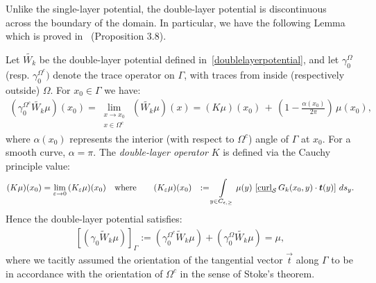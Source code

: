 Unlike the single-layer potential, the double-layer potential is
discontinuous across the boundary of the domain.  In particular, we have
the following Lemma which is proved in~\cite{mit:tay1999} (Proposition
3.8).
\begin{lemma} 
\label{l:DLPjump} 
Let $\widetilde{W_k}$ be the double-layer potential defined
in~\eqref{doublelayerpotential}, and let $\gamma_0^{\Omega}$ (resp.
$\gamma_0^{\Omega^c})$ denote the trace operator on $\Gamma$, with
traces from inside (respectively outside) $\Omega$.  For $x_{0} \in
\Gamma$ we have:
\begin{align*} 
  (\gamma^{\Omega^{c}}_0\widetilde{W_k}\mu)(x_0)=
  \lim\limits_{\substack{x \to x_0 \\ x \in \Omega^{c}}}\, 
  (\widetilde{W_k}\mu)(x) =
  (K\mu)(x_0)\,+\,\left(1-\frac{\alpha(x_0)}{2\pi}\right)\,\mu(x_0),
\end{align*}
where $\alpha(x_{0})$ represents the interior (with respect to
$\Omega^{c}$) angle of $\Gamma$ at $x_{0}$. For a smooth curve, $\alpha
= \pi$. The {\it double-layer operator} $K$ is defined via the Cauchy
principle value: 
\begin{align*}
  (K\mu)(x_0)&=\lim_{\varepsilon\rightarrow 0}
  \, (K_{\varepsilon}\mu)(x_0) \quad \mbox{where}\qquad
  (K_{\varepsilon}\mu)(x_0)&:=\int\limits_{y\in C_{\epsilon,\geq}} 
  \mu(y)\,\left[\underline{\mbox{curl}}_{\S}
  \,G_k(x_{0},y)\cdot\vec{t}(y)\right]\,ds_{y}.
\end{align*}
Hence the double-layer potential satisfies:
\begin{align*}
  \left[(\gamma_0\widetilde W_k\mu) \right]_\Gamma := 
  (\gamma^{\Omega^{c}}_0\widetilde W_k\mu)+(\gamma^{\Omega}_{0} 
  \widetilde{W_k}\mu)=\mu,
\end{align*}
where we tacitly assumed the orientation of the tangential vector
$\vec{t}$ along $\Gamma$ to be in accordance with the orientation of
$\Omega^{c}$ in the sense of Stoke's theorem.

\end{lemma}

